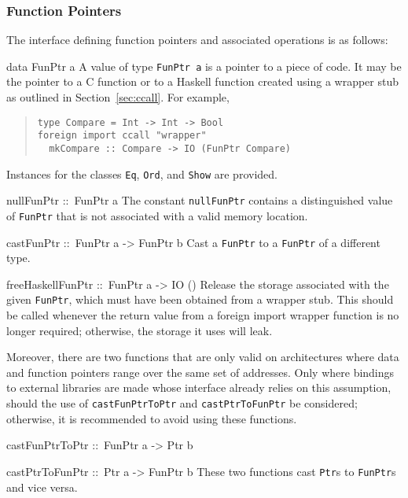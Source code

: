 \documentclass[a4paper,twoside]{article}
\makeatletter
\newcommand{\code}[1]{\texttt{#1}}      %
\newenvironment{codedesc}{%
  \list{}{\labelwidth\z@
    \let\makelabel\codedesclabel}
  }{%
  \endlist
  }
\newcommand*{\codedesclabel}[1]{%
  \hspace{-\leftmargin}
  \parbox[b]{\labelwidth}{\makebox[0pt][l]{\code{#1}}\\}\hfil\relax
  }
\newcommand{\combineitems}{\vspace*{-\itemsep}\vspace*{-\parsep}\vspace*{-1em}}
\makeatother
\begin{document}
\subsubsection{Function Pointers}

The interface defining function pointers and associated operations is as
follows:
%
\begin{codedesc}
\item[data FunPtr a] A value of type \code{FunPtr a} is a pointer to a piece
  of code.  It may be the pointer to a C function or to a Haskell function
  created using a wrapper stub as outlined in Section~\ref{sec:ccall}. For
  example,
  \begin{quote}
\begin{verbatim}
type Compare = Int -> Int -> Bool
foreign import ccall "wrapper" 
  mkCompare :: Compare -> IO (FunPtr Compare)
\end{verbatim}
  \end{quote}
  
  Instances for the classes \code{Eq}, \code{Ord}, and \code{Show} are
  provided.
\item[nullFunPtr ::\ FunPtr a] The constant \code{nullFunPtr} contains a
  distinguished value of \code{FunPtr} that is not associated with a valid
  memory location.
\item[castFunPtr ::\ FunPtr a -> FunPtr b] Cast a \code{FunPtr} to a
  \code{FunPtr} of a different type.
\item[freeHaskellFunPtr ::\ FunPtr a -> IO ()] Release the storage associated
  with the given \code{FunPtr}, which must have been obtained from a wrapper
  stub.  This should be called whenever the return value from a foreign import
  wrapper function is no longer required; otherwise, the storage it uses will
  leak.
\end{codedesc}

Moreover, there are two functions that are only valid on architectures where
data and function pointers range over the same set of addresses.  Only where
bindings to external libraries are made whose interface already relies on this
assumption, should the use of \code{castFunPtrToPtr} and
\code{castPtrToFunPtr} be considered; otherwise, it is recommended to avoid
using these functions.
%
\begin{codedesc}
\item[castFunPtrToPtr ::\ FunPtr a -> Ptr b]
\item[castPtrToFunPtr ::\ Ptr a -> FunPtr b] \combineitems These two functions
  cast \code{Ptr}s to \code{FunPtr}s and vice versa.
\end{codedesc}
\end{document}
